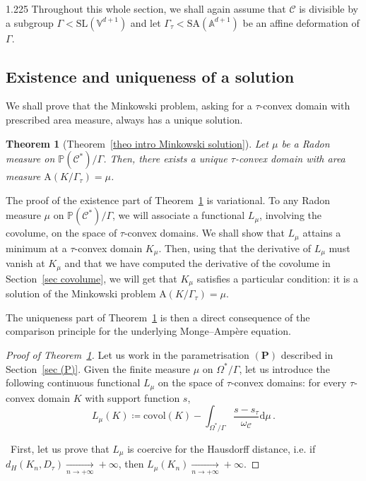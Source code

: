 \documentclass[reqno, a4paper]{amsart}
\numberwithin{equation}{section}
\numberwithin{figure}{section}
\newtheorem{theorem}{Theorem}[section]
\theoremstyle{definition}
\theoremstyle{remark}
\newcommand{\V}{\mathbb{V}} %
\newcommand{\A}{\mathbb{A}} %
\renewcommand{\P}{\mathbb{P}} %
\newcommand{\SL}{\mathrm{SL}} %
\newcommand{\SA}{\mathrm{SA}} %
\newcommand{\dif}{\mathrm{d}} %
\newcommand{\C}{\mathcal{C}} %
\newcommand{\covol}{\mathrm{covol}} %
\newcommand{\Area}{\mathrm{A}} %
\begin{document}
\begin{spacing}{1.225}
Throughout this whole section, we shall again assume that $\C$ is divisible by a subgroup $\Gamma < \SL(\V^{d+1})$ and let $\Gamma_\tau < \SA(\A^{d+1})$ be an affine deformation of $\Gamma$.

\subsection{Existence and uniqueness of a solution}

We shall prove that the Minkowski problem, asking for a $\tau$-convex domain with prescribed area measure, always has a unique solution. 

\begin{theorem}[{Theorem~\ref{theo intro Minkowski solution}}]
\label{theo Minkowski solution}
Let $\mu$ be a Radon measure on $\P(\C^*)/\Gamma$. Then, there exists a unique $\tau$-convex domain with area measure $\Area(K/\Gamma_\tau)=\mu$. 
\end{theorem}

The proof of the existence part of Theorem~\ref{theo Minkowski solution} is variational. To any Radon measure $\mu$ on $\P(\C^*)/\Gamma$, we will associate a functional $L_\mu$, involving the covolume, on the space of $\tau$-convex domains. We shall show that $L_\mu$ attains a minimum at a $\tau$-convex domain $K_\mu$. Then, using that the derivative of $L_\mu$ must vanish at $K_\mu$ and that we have computed the derivative of the covolume in Section~\ref{sec covolume}, we will get that $K_\mu$ satisfies a particular condition: it is a solution of the Minkowski problem $\Area(K/\Gamma_\tau)=\mu$.

The uniqueness part of Theorem~\ref{theo Minkowski solution} is then a direct consequence of the comparison principle \cite[Theorem~2.10]{Figalli_17} for the underlying Monge--Amp\`ere equation. 

\begin{proof}[Proof of Theorem~\ref{theo Minkowski solution}]
Let us work in the parametrisation $(\mathbf{P})$ described in Section~\ref{sec (P)}. Given the finite measure $\mu$ on $\Omega^*/\Gamma$, let us introduce the following continuous functional $L_\mu$ on the space of $\tau$-convex domains: for every $\tau$-convex domain $K$ with support function $s$, 
 \begin{equation*}
 L_\mu(K) \coloneqq \covol(K) - \int_{\Omega^*/\Gamma} \frac{s-s_\tau}{\omega_\C} \dif \mu \, . 
 \end{equation*}

\noindent \textbullet\ First, let us prove that $L_\mu$ is coercive for the Hausdorff distance, i.e. if $d_H(K_n,D_\tau)\xrightarrow[n\to+\infty]{}+\infty$, then $L_\mu(K_n)\xrightarrow[n\to+\infty]{}+\infty$. 


\end{proof}
\end{spacing}
\end{document}
